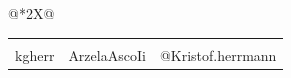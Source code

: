 \documentclass{resume}
\begin{document}
\begin{center}
\begin{tabularx}{\linewidth}{@{}*{2}{X}@{}}
{{\begin{itemize}
        \end{itemize}
    }
    \vspace{5mm}
\begin{center}
\begin{tabularx}{\linewidth}{@{}*{3}{X}@{}}
\centering{\href{https://www.linkedin.com/in/kgherr}{ \Large  \faLinkedinSquare } }
&
\centering{ \href{https://github.com/ArzelaAscoIi}{\Large \faGithub } }
&{\hspace{13mm}\href{https://www.medium.com/@Kristof.herrmann}{\Large \faMedium }}
\\
\centering\small kgherr &
\centering\small ArzelaAscoIi  & 
\centering\small @Kristof.herrmann
\end{tabularx}

\end{center}
     
    
}
\end{tabularx}
\end{center}
\end{document}
